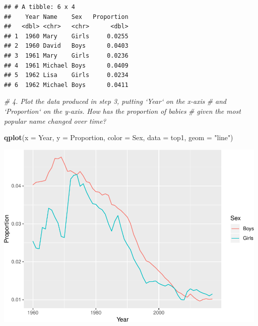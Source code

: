 \documentclass[]{book}
\newenvironment{Shaded}{\begin{snugshade}}{\end{snugshade}}
\newcommand{\CommentTok}[1]{\textcolor[rgb]{0.56,0.35,0.01}{\textit{#1}}}
\newcommand{\DataTypeTok}[1]{\textcolor[rgb]{0.13,0.29,0.53}{#1}}
\newcommand{\DecValTok}[1]{\textcolor[rgb]{0.00,0.00,0.81}{#1}}
\newcommand{\KeywordTok}[1]{\textcolor[rgb]{0.13,0.29,0.53}{\textbf{#1}}}
\newcommand{\NormalTok}[1]{#1}
\newcommand{\OperatorTok}[1]{\textcolor[rgb]{0.81,0.36,0.00}{\textbf{#1}}}
\newcommand{\StringTok}[1]{\textcolor[rgb]{0.31,0.60,0.02}{#1}}
\begin{document}
\begin{Shaded}
\end{Shaded}

\begin{verbatim}
## # A tibble: 6 x 4
##    Year Name    Sex   Proportion
##   <dbl> <chr>   <chr>      <dbl>
## 1  1960 Mary    Girls     0.0255
## 2  1960 David   Boys      0.0403
## 3  1961 Mary    Girls     0.0236
## 4  1961 Michael Boys      0.0409
## 5  1962 Lisa    Girls     0.0234
## 6  1962 Michael Boys      0.0411
\end{verbatim}

\begin{Shaded}
\begin{Highlighting}[]
\CommentTok{# 4. Plot the data produced in step 3, putting `Year` on the x-axis}
\CommentTok{#    and `Proportion` on the y-axis. How has the proportion of babies}
\CommentTok{#    given the most popular name changed over time?}

\KeywordTok{qplot}\NormalTok{(}\DataTypeTok{x =}\NormalTok{ Year, }
      \DataTypeTok{y =}\NormalTok{ Proportion, }
      \DataTypeTok{color =}\NormalTok{ Sex, }
      \DataTypeTok{data =}\NormalTok{ top1, }
      \DataTypeTok{geom =} \StringTok{"line"}\NormalTok{)}
\end{Highlighting}
\end{Shaded}

\includegraphics{R/Rintro/figures/unnamed-chunk-73-1.pdf}
\end{document}
